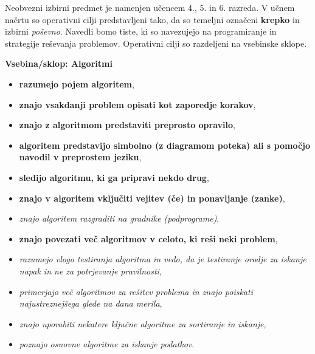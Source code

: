 Neobvezni izbirni predmet je namenjen učencem 4., 5. in 6. razreda. V
učnem načrtu so operativni cilji predstavljeni tako, da so temeljni
označeni \textbf{krepko} in izbirni \emph{poševno}. Navedli bomo
tiste, ki so navezujejo na programiranje in strategije reševanja
problemov. Operativni cilji so razdeljeni na vsebinske sklope.

\textbf{Vsebina/sklop: Algoritmi}
\begin{itemize}
\tightlist
\item \textbf{razumejo pojem algoritem},
\item \textbf{znajo vsakdanji problem opisati kot zaporedje korakov},
\item \textbf{znajo z algoritmom predstaviti preprosto opravilo},
\item \textbf{algoritem predstavijo simbolno (z diagramom poteka) ali s
  pomočjo navodil v preprostem jeziku},
\item \textbf{sledijo algoritmu, ki ga pripravi nekdo drug},
\item \textbf{znajo v algoritem vključiti vejitev (če) in ponavljanje (zanke)},
\item \emph{znajo algoritem razgraditi na gradnike (podprograme)},
\item \textbf{znajo povezati več algoritmov v celoto, ki reši neki problem},
\item \emph{razumejo vlogo testiranja algoritma in vedo, da je testiranje
  orodje za iskanje napak in ne za potrjevanje pravilnosti},
\item \emph{primerjajo več algoritmov za rešitev problema in znajo poiskati
  najustreznejšega glede na dana merila},
\item \emph{znajo uporabiti nekatere ključne algoritme za sortiranje in
  iskanje},
\item \emph{poznajo osnovne algoritme za iskanje podatkov}.
\end{itemize}

